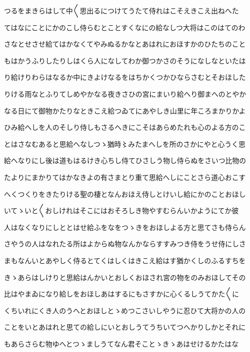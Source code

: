 \documentclass[a4paper,11pt,landscape]{ltjtarticle}
\begin{document}
\par\medskip
つるをまきらはして中〱思出るにつけてうたて侍れはこそえきこえ出ねへた
\par\medskip
てはなにことにかのこし侍らむとことすくなにの給なしつ大将はこのはてのわ
\par\medskip
さなとせさせ給てはかなくてやみぬるかなとあはれにおほすかのひたちのこと
\par\medskip
もはかうふりしたりしはくら人になしてわか御つかさのそうになしなといたは
\par\medskip
り給けりわらはなるか中にきよけなるをはちかくつかひならさむとそおほした
\par\medskip
りける雨なとふりてしめやかなる夜きさひの宮にまいり給へり御まへのとやか
\par\medskip
なる日にて御物かたりなときこえ給つゐてにあやしき山里に年ころまかりかよ
\par\medskip
ひみ給へしを人のそしり侍しもさるへきにこそはあらめたれも心のよる方のこ
\par\medskip
とはさなむあると思給へなしつゝ猶時〻みたまへしを所のさかにやと心うく思
\par\medskip
給へなりにし後は道もはるけき心ちし侍てひさしう物し侍らぬをさいつ比物の
\par\medskip
たよりにまかりてはかなきよの有さまとり重て思給へしにことさら道心おこす
\par\medskip
へくつくりをきたりける聖の棲となんおほえ侍しとけいし給にかのことおほし
\par\medskip
いてゝいと〱おしけれはそこにはおそろしき物やすむらんいかようにてか彼
\par\medskip
人はなくなりにしととはせ給ふをなをつゝきをおほしよる方と思てさも侍らん
\par\medskip
さやうの人はなれたる所はよからぬ物なんかならすすみつき侍をうせ侍にしさ
\par\medskip
まもなんいとあやしく侍るとてくはしくはきこえ給はす猶かくしのふるすちを
\par\medskip
きゝあらはしけりと思給はんかいとおしくおほされ宮の物をのみおほしてその
\par\medskip
比はやまゐになり給しをおほしあはするにもさすかに心くるしうてかた〱に
\par\medskip
くちいれにくき人のうへとおほしとゝめつこさいしやうに忍ひて大将かの人の
\par\medskip
ことをいとあはれと思ての給しにいとおしうてうちいてつへかりしかとそれに
\par\medskip
もあらさらむ物ゆへとつゝましうてなん君そことゝきゝあはせけるかたはな
\par\medskip
\end{document}
